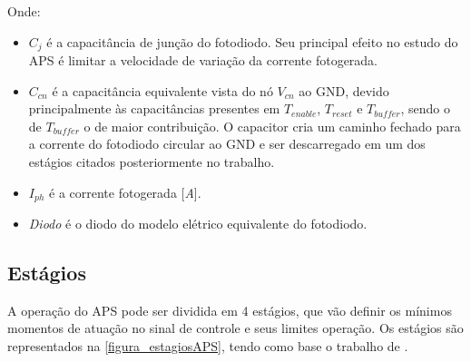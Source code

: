 Onde: 

\begin{itemize}
    \item $C_j$ \'e a capacit\^ancia de junção do fotodiodo. Seu principal efeito no estudo do APS \'e limitar a velocidade de variação da corrente fotogerada.
    
    \item $C_{cn}$ \'e a capacit\^ancia equivalente vista do n\'o $V_{cn}$ ao GND, devido principalmente às capacit\^ancias presentes em $T_{enable}$,  $T_{reset}$ e $T_{buffer}$, sendo o de $T_{buffer}$ o de maior contribuição. O capacitor cria um caminho fechado para a corrente do fotodiodo circular ao GND e ser descarregado em um dos est\'agios citados posteriormente no trabalho.
    
    \item $I_{ph}$ \'e a corrente fotogerada [\textit{A}].
    
    \item \textit{Diodo} \'e o diodo do modelo el\'etrico equivalente do fotodiodo.
\end{itemize}

\subsection{Est\'agios}
\label{estagiosAPS}

A operação do APS pode ser dividida em 4 est\'agios, que vão definir os m\'inimos momentos de  atuação no sinal de controle e seus limites operação. Os est\'agios são representados na \autoref{figura_estagiosAPS}, tendo como base o trabalho de \cite{LidianeCampos}.

